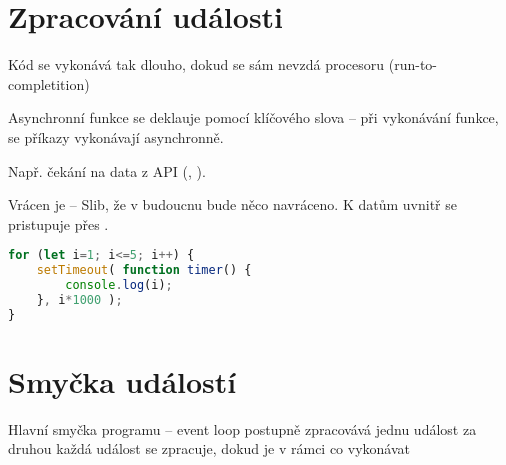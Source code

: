 
\section{Zpracování události}

\begin{compactitem}
    \item Kód se vykonává tak dlouho, dokud se sám nevzdá procesoru (run-to-completition)
\end{compactitem}

\begin{compactitem}
    \item Asynchronní funkce se deklauje pomocí klíčového slova  -- při vykonávání funkce, se příkazy vykonávají asynchronně.
    \item Např. čekání na data z API (, ).
    \item Vrácen je  -- Slib, že v budoucnu bude něco navráceno. K datům uvnitř  se pristupuje přes .
\end{compactitem}

\noindent\begin{minipage}{\linewidth}
\begin{lstlisting}[language=javascript, caption={Příklad asynchronního programování, async + await.}]
for (let i=1; i<=5; i++) {
    setTimeout( function timer() {
        console.log(i);
    }, i*1000 );
}
\end{lstlisting}
\end{minipage}

\begin{compactitem}
    \item {}
\end{compactitem}


\section{Smyčka událostí}

Hlavní smyčka programu -- event loop
postupně zpracovává jednu událost za druhou
každá událost se zpracuje, dokud je v rámci co vykonávat

\begin{compactitem}
    \item {}
\end{compactitem}

